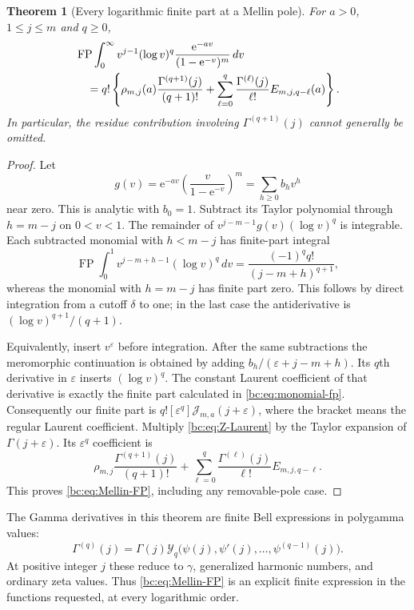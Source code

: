 \documentclass[11pt,letterpaper]{article}
\numberwithin{equation}{section}
\newtheorem{theorem}{Theorem}[section]
\theoremstyle{definition}
\theoremstyle{remark}
\newcommand{\bcFP}{\operatorname{FP}}
\newcommand{\bcY}{\mathcal Y}
\newcommand{\bcJ}{\mathcal J}
\newcommand{\bce}{\mathrm e}
\begin{document}
\begin{theorem}[Every logarithmic finite part at a Mellin pole]
\label{bc:thm:mellin-fp}
For $a>0$, $1\le j\le m$ and $q\ge0$,
\begin{align}
 &\bcFP\int_0^\infty v^{j-1}(\log v)^q
                  \frac{\bce^{-av}}{(1-\bce^{-v})^m}\,dv\notag\\
 &\quad=q!\left\{
     \rho_{m,j}(a)\frac{\Gamma^{(q+1)}(j)}{(q+1)!}
     +\sum_{\ell=0}^q
         \frac{\Gamma^{(\ell)}(j)}{\ell!}
                     E_{m,j,q-\ell}(a)\right\}.
 \label{bc:eq:Mellin-FP}
\end{align}
In particular, the residue contribution involving
$\Gamma^{(q+1)}(j)$ cannot generally be omitted.
\end{theorem}
\begin{proof}
Let
\[
 g(v)=\bce^{-av}\left(\frac{v}{1-\bce^{-v}}\right)^m
                      =\sum_{h\ge0}b_hv^h
\]
near zero. This is analytic with $b_0=1$. Subtract its Taylor polynomial
through $h=m-j$ on $0<v<1$. The remainder of
$v^{j-m-1}g(v)(\log v)^q$ is integrable. Each subtracted monomial with
$h<m-j$ has finite-part integral
\begin{equation}\label{bc:eq:monomial-fp}
 \bcFP\int_0^1v^{j-m+h-1}(\log v)^q\,dv
   =\frac{(-1)^qq!}{(j-m+h)^{q+1}},
\end{equation}
whereas the monomial with $h=m-j$ has finite part zero. This follows
by direct integration from a cutoff $\delta$ to one; in the last case
the antiderivative is $(\log v)^{q+1}/(q+1)$.

Equivalently, insert $v^\varepsilon$ before integration. After the same
subtractions the meromorphic continuation is obtained by adding
$b_h/(\varepsilon+j-m+h)$. Its $q$th derivative in $\varepsilon$
inserts $(\log v)^q$. The constant Laurent coefficient of that derivative
is exactly the finite part calculated in \eqref{bc:eq:monomial-fp}.
Consequently our finite part is
$q![\varepsilon^q]\bcJ_{m,a}(j+\varepsilon)$, where the bracket means
the regular Laurent coefficient. Multiply
\eqref{bc:eq:Z-Laurent} by the Taylor expansion of
$\Gamma(j+\varepsilon)$. Its $\varepsilon^q$ coefficient is
\[
 \rho_{m,j}\frac{\Gamma^{(q+1)}(j)}{(q+1)!}
 +\sum_{\ell=0}^q\frac{\Gamma^{(\ell)}(j)}{\ell!}E_{m,j,q-\ell}.
\]
This proves \eqref{bc:eq:Mellin-FP}, including any removable-pole case.
\end{proof}

The Gamma derivatives in this theorem are finite Bell expressions in
polygamma values:
\begin{equation}\label{bc:eq:Gamma-Bell}
 \Gamma^{(q)}(j)=\Gamma(j)
          \bcY_q\bigl(\psi(j),\psi'(j),\ldots,\psi^{(q-1)}(j)\bigr).
\end{equation}
At positive integer $j$ these reduce to $\gamma$, generalized harmonic
numbers, and ordinary zeta values. Thus \eqref{bc:eq:Mellin-FP} is an
explicit finite expression in the functions requested, at every
logarithmic order.
\end{document}
